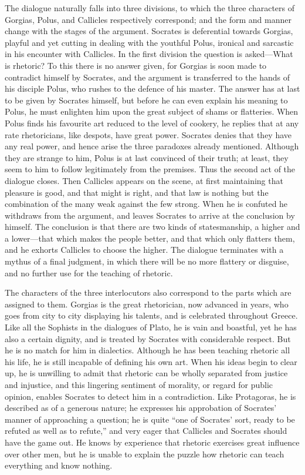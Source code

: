 \documentclass[11pt,letter]{article}
\begin{document}
\par  The dialogue naturally falls into three divisions, to which the three characters of Gorgias, Polus, and Callicles respectively correspond; and the form and manner change with the stages of the argument. Socrates is deferential towards Gorgias, playful and yet cutting in dealing with the youthful Polus, ironical and sarcastic in his encounter with Callicles. In the first division the question is asked—What is rhetoric? To this there is no answer given, for Gorgias is soon made to contradict himself by Socrates, and the argument is transferred to the hands of his disciple Polus, who rushes to the defence of his master. The answer has at last to be given by Socrates himself, but before he can even explain his meaning to Polus, he must enlighten him upon the great subject of shams or flatteries. When Polus finds his favourite art reduced to the level of cookery, he replies that at any rate rhetoricians, like despots, have great power. Socrates denies that they have any real power, and hence arise the three paradoxes already mentioned. Although they are strange to him, Polus is at last convinced of their truth; at least, they seem to him to follow legitimately from the premises. Thus the second act of the dialogue closes. Then Callicles appears on the scene, at first maintaining that pleasure is good, and that might is right, and that law is nothing but the combination of the many weak against the few strong. When he is confuted he withdraws from the argument, and leaves Socrates to arrive at the conclusion by himself. The conclusion is that there are two kinds of statesmanship, a higher and a lower—that which makes the people better, and that which only flatters them, and he exhorts Callicles to choose the higher. The dialogue terminates with a mythus of a final judgment, in which there will be no more flattery or disguise, and no further use for the teaching of rhetoric.

\par  The characters of the three interlocutors also correspond to the parts which are assigned to them. Gorgias is the great rhetorician, now advanced in years, who goes from city to city displaying his talents, and is celebrated throughout Greece. Like all the Sophists in the dialogues of Plato, he is vain and boastful, yet he has also a certain dignity, and is treated by Socrates with considerable respect. But he is no match for him in dialectics. Although he has been teaching rhetoric all his life, he is still incapable of defining his own art. When his ideas begin to clear up, he is unwilling to admit that rhetoric can be wholly separated from justice and injustice, and this lingering sentiment of morality, or regard for public opinion, enables Socrates to detect him in a contradiction. Like Protagoras, he is described as of a generous nature; he expresses his approbation of Socrates’ manner of approaching a question; he is quite “one of Socrates’ sort, ready to be refuted as well as to refute,” and very eager that Callicles and Socrates should have the game out. He knows by experience that rhetoric exercises great influence over other men, but he is unable to explain the puzzle how rhetoric can teach everything and know nothing.
\end{document}
